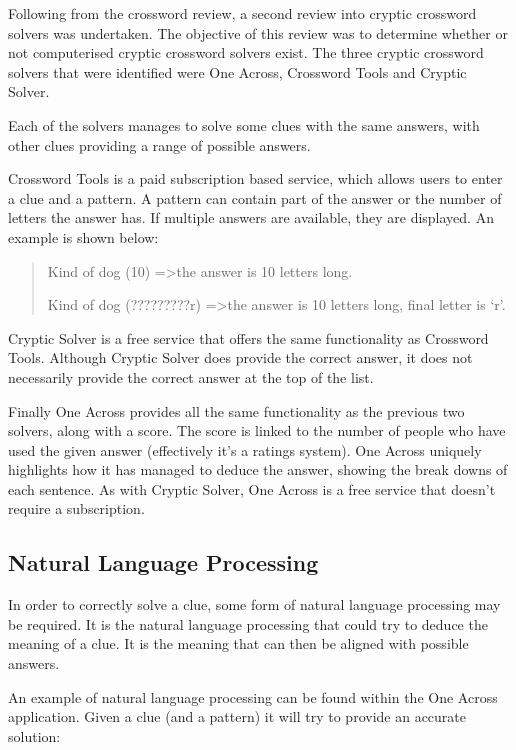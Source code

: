 Following from the crossword review, a second review into cryptic crossword 
solvers was undertaken. The objective of this review was to determine whether 
or not computerised cryptic crossword solvers exist. The three cryptic 
crossword solvers that were identified were One Across, Crossword Tools and 
Cryptic Solver.

Each of the solvers manages to solve some clues with the same answers, with 
other clues providing a range of possible answers.

Crossword Tools \citep{crosswordtools} is a paid subscription based service, 
which allows users to enter a clue and a pattern. A pattern can contain part of
the answer or the number of letters the answer has. If multiple answers are 
available, they are displayed. An example is shown below:

\begin{quote}
Kind of dog (10) =\textgreater the answer is 10 letters long.

Kind of dog (?????????r) =\textgreater the answer is 10 letters long, final 
letter is `r'.
\end{quote}

Cryptic Solver \citep{crypticsolver} is a free service that offers the same 
functionality as Crossword Tools. Although Cryptic Solver does provide the 
correct answer, it does not necessarily provide the correct answer at the top 
of the list.

Finally One Across \citep{oneacross} provides all the same functionality as the
previous two solvers, along with a score. The score is linked to the number of 
people who have used the given answer (effectively it's a ratings system). One 
Across uniquely highlights how it has managed to deduce the answer, showing 
the break downs of each sentence. As with Cryptic Solver, One Across is a free 
service that doesn't require a subscription.


\subsection{Natural Language Processing}

In order to correctly solve a clue, some form of natural language processing 
may be required. It is the natural language processing that could try to deduce 
the meaning of a clue. It is the meaning that can then be aligned with possible 
answers.

An example of natural language processing can be found within the One Across 
application. Given a clue (and a pattern) it will try to provide an accurate 
solution:

